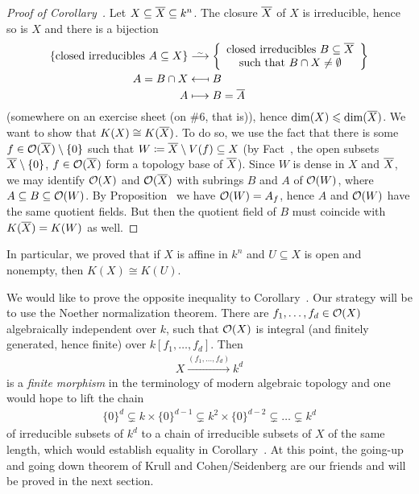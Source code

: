 \documentclass[a4paper,parskip=half,numbers=enddot, DIV=12]{scrreprt}
\renewcommand{\leq}{\leqslant}
\begin{document}
	\begin{proof}[Proof of Corollary~]
		Let $X\subseteq\overline X\subseteq k^n$. The closure $\overline X$ of $X$ is irreducible, hence so is $X$ and there is a bijection
		\begin{align*}
			\{\text{closed irreducibles }A\subseteq X\}&\isomorphism\left\{
			\begin{array}{c}
				\text{closed irreducibles }B\subseteq\ov X\\
				\text{such that }B\cap X\not=\emptyset
			\end{array}\right\}\\
			A=B\cap X&\longmapsfrom B\\
			A&\longmapsto B=\ov A
		\end{align*}
		(somewhere on an exercise sheet (on \#6, that is)), hence $\dim (X)\leq\dim (\ov X)$. We want to show that $K(X)\cong K(\overline X)$. To do so, we use the fact that there is some $f\in\mathcal{O}(\overline X)\setminus\{0\}$ such that $W\coloneqq \overline X\setminus V(f)\subseteq X$ (by Fact~, the open subsets $\overline X\setminus\{0\}$, $f\in\mathcal{O}(\overline X)$ form a topology base of $\overline X$). Since $W$ is dense in $X$ and $\overline X$, we may identify $\mathcal{O}(X)$ and $\mathcal{O}(\overline X)$ with subrings $B$ and $A$ of $\mathcal{O}(W)$, where $A\subseteq B\subseteq \mathcal{O}(W)$. By Proposition~ we have $\mathcal{O}(W)=A_f$, hence $A$ and $\mathcal{O}(W)$ have the same quotient fields. But then the quotient field of $B$ must coincide with $K(\overline X)=K(W)$ as well.
	\end{proof}
	\begin{rem*} 
		In particular, we proved that if $X$ is affine in $k^n$ and $U\subseteq X$ is open and nonempty, then $K(X)\cong K(U)$.
	\end{rem*}
	
	We would like to prove the opposite inequality to Corollary~. Our strategy will be to use the Noether normalization theorem. There are $f_1,\ldots,f_d\in\mathcal{O}(X)$ algebraically independent over $k$, such that $\mathcal{O}(X)$ is integral (and finitely generated, hence finite) over $k[f_1,\ldots,f_d]$. Then
	\begin{align*}
		X\xrightarrow{(f_1,\ldots,f_d)}k^d
	\end{align*}
	is a \emph{finite morphism} in the terminology of modern algebraic topology and one would hope to lift the chain
	\begin{align*}
		\{0\}^d\subsetneq k\times\{0\}^{d-1}\subsetneq k^2\times\{0\}^{d-2}\subsetneq\ldots\subsetneq k^d
	\end{align*}
	of irreducible subsets of $k^d$ to a chain of irreducible subsets of $X$ of the same length, which would establish equality in Corollary~. At this point, the going-up and going down theorem of Krull and Cohen/Seidenberg are our friends and will be proved in the next section.
	
\end{document}
